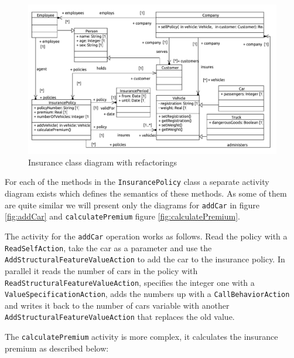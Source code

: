\documentclass{llncs}
\begin{document}
\begin{figure}[h!t]
 \centering
 \includegraphics[scale=0.5]{images/insurance_ref/Model_Model_ClassDiagram}
 \caption{Insurance class diagram with refactorings}
 \label{fig:classdiagramcomplexRef}
\end{figure}

For each of the methods in the \lstinline|InsurancePolicy| class a separate activity diagram exists which defines the semantics 
of these methods. As some of them are quite similar we will present only the diagrams for \lstinline|addCar| in figure 
\ref{fig:addCar} and \lstinline|calculatePremium| figure \ref{fig:calculatePremium}.

The activity for the \lstinline|addCar| operation works as follows. Read the policy with a \lstinline|ReadSelfAction|, take the 
car as a parameter and use the \lstinline|AddStructuralFeatureValueAction| to add the car to the insurance policy. In parallel 
it reads the number of cars in the policy with \lstinline|ReadStructuralFeatureValueAction|, specifies the integer one with 
a \lstinline|ValueSpecificationAction|, adds the numbers up with a \lstinline|CallBehaviorAction| and writes it back to the 
number of cars variable with another \lstinline|AddStructuralFeatureValueAction| that replaces the old value.

The \lstinline|calculatePremium| activity is more complex, it calculates the insurance premium as described below:
\end{document}

